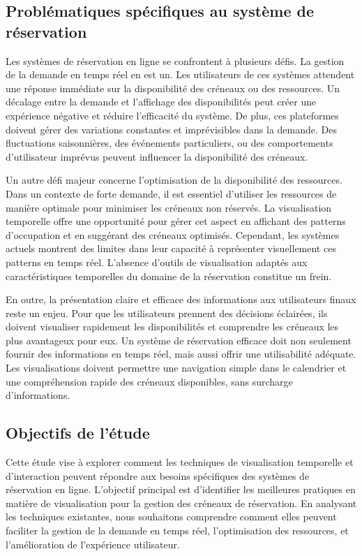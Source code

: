 \documentclass[runningheads]{llncs}
\begin{document}
\subsection{Problématiques spécifiques au système de réservation}
Les systèmes de réservation en ligne se confrontent à plusieurs défis. La gestion de la demande en temps réel en est un. Les utilisateurs de ces systèmes attendent une réponse immédiate sur la disponibilité des créneaux ou des ressources. Un décalage entre la demande et l’affichage des disponibilités peut créer une expérience négative et réduire l'efficacité du système. De plus, ces plateformes doivent gérer des variations constantes et imprévisibles dans la demande. Des fluctuations saisonnières, des événements particuliers, ou des comportements d'utilisateur imprévus peuvent influencer la disponibilité des créneaux.

Un autre défi majeur concerne l’optimisation de la disponibilité des ressources. Dans un contexte de forte demande, il est essentiel d’utiliser les ressources de manière optimale pour minimiser les créneaux non réservés. La visualisation temporelle offre une opportunité pour gérer cet aspect en affichant des patterns d’occupation et en suggérant des créneaux optimisés. Cependant, les systèmes actuels montrent des limites dans leur capacité à représenter visuellement ces patterns en temps réel. L’absence d’outils de visualisation adaptés aux caractéristiques temporelles du domaine de la réservation constitue un frein.

En outre, la présentation claire et efficace des informations aux utilisateurs finaux reste un enjeu. Pour que les utilisateurs prennent des décisions éclairées, ils doivent visualiser rapidement les disponibilités et comprendre les créneaux les plus avantageux pour eux. Un système de réservation efficace doit non seulement fournir des informations en temps réel, mais aussi offrir une utilisabilité adéquate. Les visualisations doivent permettre une navigation simple dans le calendrier et une compréhension rapide des créneaux disponibles, sans surcharge d'informations.

\subsection{Objectifs de l’étude}
Cette étude vise à explorer comment les techniques de visualisation temporelle et d'interaction peuvent répondre aux besoins spécifiques des systèmes de réservation en ligne. L’objectif principal est d’identifier les meilleures pratiques en matière de visualisation pour la gestion des créneaux de réservation. En analysant les techniques existantes, nous souhaitons comprendre comment elles peuvent faciliter la gestion de la demande en temps réel, l’optimisation des ressources, et l’amélioration de l’expérience utilisateur.
\end{document}
